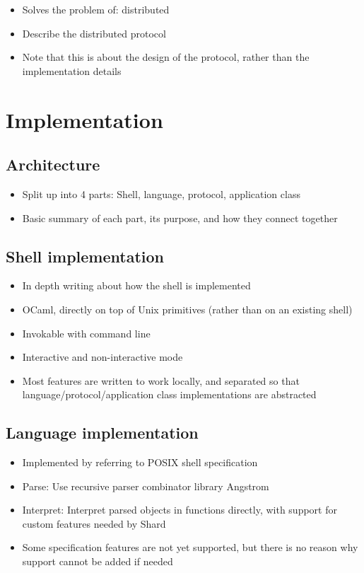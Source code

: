 \documentclass[twoside]{report}
\begin{document}
\begin{itemize}
  \item Solves the problem of: distributed
  \item Describe the distributed protocol
  \item Note that this is about the design of the protocol, rather than the implementation details
\end{itemize}

\chapter{Implementation}

\section{Architecture}

\begin{itemize}
  \item Split up into 4 parts: Shell, language, protocol, application class
  \item Basic summary of each part, its purpose, and how they connect together
\end{itemize}

\section{Shell implementation}

\begin{itemize}
  \item In depth writing about how the shell is implemented
  \item OCaml, directly on top of Unix primitives (rather than on an existing shell)
  \item Invokable with command line
  \item Interactive and non-interactive mode
  \item Most features are written to work locally, and separated so that language/protocol/application class implementations are abstracted
\end{itemize}

\section{Language implementation}

\begin{itemize}
  \item Implemented by referring to POSIX shell specification
  \item Parse: Use recursive parser combinator library Angstrom
  \item Interpret: Interpret parsed objects in functions directly, with support for custom features needed by Shard
  \item Some specification features are not yet supported, but there is no reason why support cannot be added if needed
\end{itemize}
\end{document}
